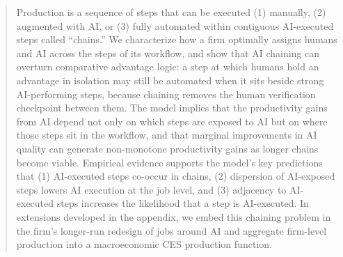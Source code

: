 \documentclass[11pt]{article}
\theoremstyle{plain}
\theoremstyle{plain}
\theoremstyle{definition} %
\begin{document}
\maketitle
\begin{abstract}
\noindent Production is a sequence of steps that can be executed (1) manually, (2) augmented with AI, or (3) fully automated within contiguous AI-executed steps called ``chains.''
We characterize how a firm optimally assigns humans and AI across the steps of its workflow, and show that AI chaining can overturn comparative advantage logic: a step at which humans hold an advantage in isolation may still be automated when it sits beside strong AI-performing steps, because chaining removes the human verification checkpoint between them.
The model implies that the productivity gains from AI depend not only on which steps are exposed to AI but on where those steps sit in the workflow, and that marginal improvements in AI quality can generate non-monotone productivity gains as longer chains become viable.
Empirical evidence supports the model's key predictions that (1) AI-executed steps co-occur in chains, (2) dispersion of AI-exposed steps lowers AI execution at the job level, and (3) adjacency to AI-executed steps increases the likelihood that a step is AI-executed.
In extensions developed in the appendix, we embed this chaining problem in the firm's longer-run redesign of jobs around AI and aggregate firm-level production into a macroeconomic CES production function.


\end{abstract}
\end{document}
